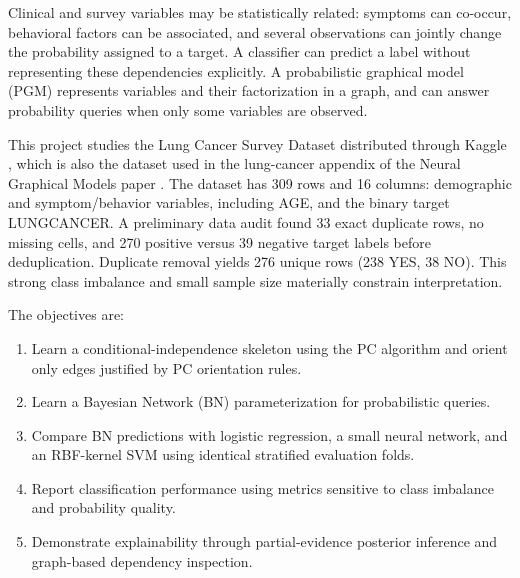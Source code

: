 \documentclass[10pt,twocolumn,letterpaper]{article}
\makeatletter
\renewcommand\section{\@startsection{section}{1}{\z@}{1.5ex plus 0.5ex minus 0.2ex}{1ex plus 0.2ex}{\centering\normalfont\footnotesize\scshape}}
\newcommand{\us}{\textunderscore\allowbreak}
\newcommand{\var}[1]{{\small\ttfamily\let\_\us #1}}
\makeatother
\begin{document}
\section{Introduction}
Clinical and survey variables may be statistically related: symptoms can co-occur, behavioral factors can be associated, and several observations can jointly change the probability assigned to a target. A classifier can predict a label without representing these dependencies explicitly. A probabilistic graphical model (PGM) represents variables and their factorization in a graph, and can answer probability queries when only some variables are observed.

This project studies the Lung Cancer Survey Dataset distributed through Kaggle \cite{kaggle}, which is also the dataset used in the lung-cancer appendix of the Neural Graphical Models paper \cite{ngm}. The dataset has 309 rows and 16 columns: demographic and symptom/behavior variables, including \var{AGE}, and the binary target \var{LUNG\_CANCER}. A preliminary data audit found 33 exact duplicate rows, no missing cells, and 270 positive versus 39 negative target labels before deduplication. Duplicate removal yields 276 unique rows (238 YES, 38 NO). This strong class imbalance and small sample size materially constrain interpretation.

The objectives are:
\begin{enumerate}\itemsep0pt
\item Learn a conditional-independence skeleton using the PC algorithm and orient only edges justified by PC orientation rules.
\item Learn a Bayesian Network (BN) parameterization for probabilistic queries.
\item Compare BN predictions with logistic regression, a small neural network, and an RBF-kernel SVM using identical stratified evaluation folds.
\item Report classification performance using metrics sensitive to class imbalance and probability quality.
\item Demonstrate explainability through partial-evidence posterior inference and graph-based dependency inspection.
\end{enumerate}
\end{document}
